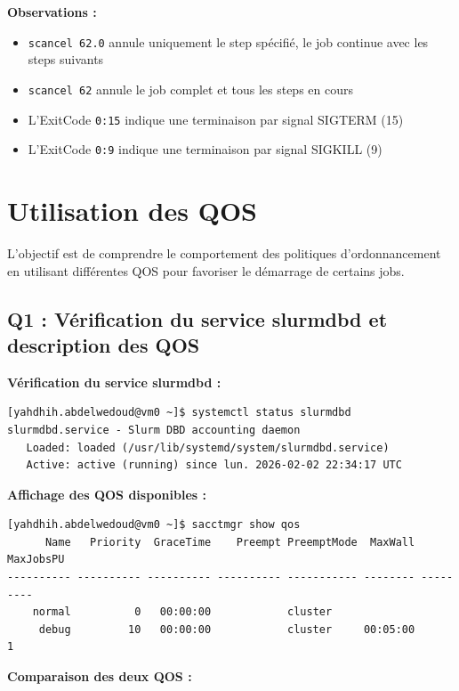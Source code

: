 \documentclass[12pt,a4paper]{article}
\newcommand{\code}[1]{\texttt{#1}}
\begin{document}
\textbf{Observations :}
\begin{itemize}
    \item \code{scancel 62.0} annule uniquement le step spécifié, le job continue avec les steps suivants
    \item \code{scancel 62} annule le job complet et tous les steps en cours
    \item L'ExitCode \code{0:15} indique une terminaison par signal SIGTERM (15)
    \item L'ExitCode \code{0:9} indique une terminaison par signal SIGKILL (9)
\end{itemize}

\section{Utilisation des QOS}

L'objectif est de comprendre le comportement des politiques d'ordonnancement en utilisant différentes QOS pour favoriser le démarrage de certains jobs.

\subsection{Q1 : Vérification du service slurmdbd et description des QOS}

\textbf{Vérification du service slurmdbd :}
\begin{lstlisting}
[yahdhih.abdelwedoud@vm0 ~]$ systemctl status slurmdbd
slurmdbd.service - Slurm DBD accounting daemon
   Loaded: loaded (/usr/lib/systemd/system/slurmdbd.service)
   Active: active (running) since lun. 2026-02-02 22:34:17 UTC
\end{lstlisting}

\textbf{Affichage des QOS disponibles :}
\begin{lstlisting}
[yahdhih.abdelwedoud@vm0 ~]$ sacctmgr show qos
      Name   Priority  GraceTime    Preempt PreemptMode  MaxWall MaxJobsPU
---------- ---------- ---------- ---------- ----------- -------- ---------
    normal          0   00:00:00            cluster                    
     debug         10   00:00:00            cluster     00:05:00        1
\end{lstlisting}

\textbf{Comparaison des deux QOS :}
\end{document}
